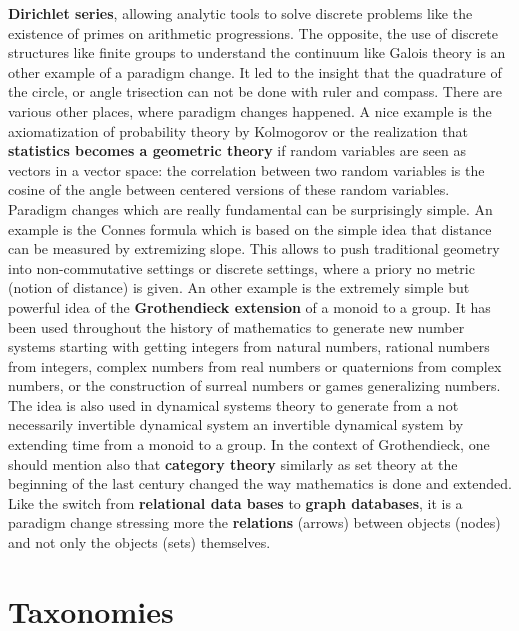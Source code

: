 \documentclass[12pt]{amsart}
\newcounter{example}    \def\example#1{ \item \fontsize{12}{15} \selectfont #1 \fontsize{12}{15} \selectfont }
\begin{document}
{\bf Dirichlet series}, allowing analytic tools to solve discrete problems like the existence
of primes on arithmetic progressions. 
The opposite, the use of discrete structures like finite groups to understand the continuum
like Galois theory is an other example of a paradigm change. It led to the insight that 
the quadrature of the circle, or angle trisection can not be done with ruler and compass. 
There are various other places, where paradigm changes happened. A nice example is
the axiomatization of probability theory by Kolmogorov or the realization that {\bf statistics
becomes a geometric theory} if random variables are seen as vectors in a vector space:
the correlation between two random variables is the cosine of the angle between centered versions of these random 
variables. Paradigm changes which are really fundamental can be surprisingly simple. 
An example is the Connes formula \cite{Connes} which is based on the simple idea that distance
can be measured by extremizing slope. This allows to push traditional geometry into non-commutative settings
or discrete settings, where a priory no metric (notion of distance) is given. 
An other example is the extremely simple but powerful idea of the {\bf Grothendieck extension}
of a monoid to a group. It has been used throughout the history of mathematics to generate new number
systems starting with getting integers from natural numbers, rational numbers from integers, complex numbers from real numbers
or quaternions from complex numbers, or the construction of surreal numbers or games generalizing numbers.
The idea is also used in dynamical systems theory to generate
from a not necessarily invertible dynamical system an invertible dynamical system by extending time
from a monoid to a group. In the context of Grothendieck, one should mention also that {\bf category theory}
similarly as set theory at the beginning of the last century changed the way mathematics is done
and extended. Like the switch from {\bf relational data bases} to {\bf graph databases}, it is a paradigm change
stressing more the {\bf relations} (arrows) between objects (nodes) and not only the objects (sets) themselves.


\section*{Taxonomies} 
\end{document}
